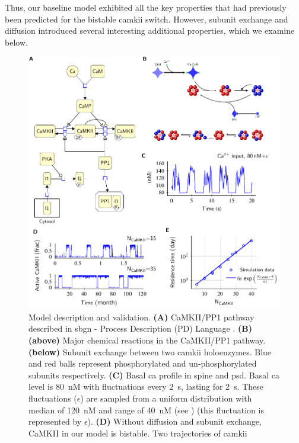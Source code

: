\documentclass[9pt,lineno,doublespacing]{elife}
\begin{document}
Thus, our baseline model exhibited all the key properties that had
previously been predicted for the bistable \gls{camkii} switch. However, 
subunit exchange and diffusion introduced several interesting additional
properties, which we examine below.

\begin{figure}[t]%
    \includegraphics[width=0.95\linewidth]{./PaperFigures/elifeFigure1/figure_validation_178mm.pdf}
    \caption{Model description and validation. \textbf{(A)} CaMKII/PP1 pathway
        described in \gls{sbgn} - Process Description (PD) Language
        \citep{novere_systems_2009}. \textbf{(B)} \textbf{(above)} Major
        chemical reactions in the CaMKII/PP1 pathway. \textbf{(below)} Subunit
        exchange between two \gls{camkii} holoenzymes. Blue and red balls
        represent phosphorylated and un-phosphorylated subunits respectively.
        \textbf{(C)} Basal \gls{ca} profile in spine and \gls{psd}. Basal
        \gls{ca} level is \SI{80}{\nano M} with fluctuations every
        \SI{2}{\second}, lasting for \SI{2}{\second}. These fluctuations
        ($\epsilon$) are sampled from a uniform distribution with median of
        \SI{120}{\nano M} and range of \SI{40}{\nano M} (see
        ) (this fluctuation is represented by
        $\epsilon$). \textbf{(D)} Without diffusion and subunit exchange,
        CaMKII in our model is bistable. Two trajectories of \gls{camkii}
}
\end{figure}
\end{document}

